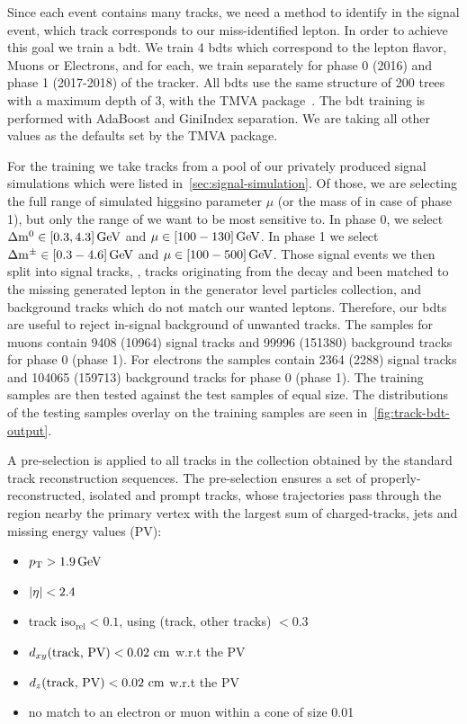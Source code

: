 Since each event contains many tracks, we need a method to identify in the signal event, which track corresponds to our miss-identified lepton. In order to achieve this goal we train a \gls{bdt}. We train 4 \glspl{bdt} which correspond to the lepton flavor, Muons or Electrons, and for each, we train separately for phase 0 (2016) and phase 1 (2017-2018) of the tracker. All \glspl{bdt} use the same structure of 200 trees with a maximum depth of 3, with the TMVA package~\cite{tmva}. The \gls{bdt} training is performed with AdaBoost and GiniIndex separation. We are taking all other values as the defaults set by the TMVA package.

For the training we take tracks from a pool of our privately produced \FASTSIM signal simulations which were listed in~\ref{sec:signal-simulation}. Of those, we are selecting the full range of simulated higgsino parameter $\mu$ (or the mass of \PSGcpmDo in case of phase 1), but only the range of \dm we want to be most sensitive to. In phase 0, we select $\Delta\mathrm{m}^0\in [0.3,4.3]\,\text{Ge\hspace{-.08em}V}$ and $\mu\in [100-130]\,\text{Ge\hspace{-.08em}V}$. In phase 1 we select $\Delta\mathrm{m}^\pm \in [0.3-4.6]\,\text{Ge\hspace{-.08em}V}$ and $\mu\in [100-500]\,\text{Ge\hspace{-.08em}V}$. Those signal events we then split into signal tracks, \ie, tracks originating from the decay \neuttdecay and been matched to the missing generated lepton in the generator level particles collection, and background tracks which do not match our wanted leptons. Therefore, our \glspl{bdt} are useful to reject in-signal background of unwanted tracks. The samples for muons contain 9408 (10964) signal tracks and 99996 (151380) background tracks for phase 0 (phase 1). For electrons the samples contain 2364 (2288) signal tracks and 104065 (159713) background tracks for phase 0 (phase 1). The training samples are then tested against the test samples of equal size. The distributions of the testing samples overlay on the training samples are seen in~\ref{fig:track-bdt-output}.

A pre-selection is applied to all tracks in the collection obtained by the standard track reconstruction sequences. The pre-selection ensures a set of properly-reconstructed, isolated and prompt tracks, whose trajectories pass through the region nearby the primary vertex with the largest sum of charged-tracks, jets and missing energy values (PV): 

\begin{itemize}
\item $ p_{\mathrm{T}} > 1.9 \,\text{Ge\hspace{-.08em}V}$
\item $ \lvert \eta \rvert < 2.4$
\item track $\text{iso}_\text{rel}  < 0.1$, using \DR(track, other tracks) $< 0.3$
\item $d_{xy}(\text{track, PV}) < 0.02\, \,\text{cm}$ w.r.t the PV
\item $d_z(\text{track, PV}) < 0.02\, \,\text{cm}$ w.r.t the PV
\item no match to an electron or muon within a cone of size 0.01
\end{itemize}

